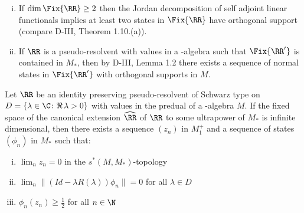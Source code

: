\begin{remark}\label{rem:d4-4.2}
\begin{enumerate}[(i), wide]
\item
If $ \dim \Fix{\RR} \geq 2 $  then the Jordan decomposition of self adjoint linear functionals implies at least two states in $ \Fix{\RR} $  have orthogonal support (compare D-III, Theorem 1.10.(a)).

\item
If $ \RR $  is a pseudo-resolvent with values in a \WA-algebra such that $ \Fix{\RR'} $  is contained in $ M_{*} $, then by D-III, Lemma 1.2 there exists a sequence of normal states in $ \Fix{\RR'} $  with orthogonal supports in $ M $.
\end{enumerate}
\end{remark}
\begin{lemma}\label{lem:d4-4.3}
Let $ \RR $  be an identity preserving pseudo-resolvent of Schwarz type on $ D = \{\lambda \in \C \colon  \Re\,\lambda > 0\} $  with values in the predual of a \WA-algebra $ M $.
If the fixed space of the canonical extension $ \widehat{\RR} $  of $ \RR $  to some ultrapower of $ M_{*} $  is infinite dimensional, then there exists a sequence $ (z_{n}) $  in $ M_{1}^{+} $  and a sequence of states $ (\phi_{n}) $  in $ M_{*} $  such that:
\begin{enumerate}[(i)]

\item\label{item:d4-4.3-i}
$ \lim_{n} z_{n} = 0 $  in the $ s^{*}(M,M_{*}) $-topology

\item\label{item:d4-4.3-ii}
$ \lim_{n} \|(Id - \lambda R(\lambda))\phi_{n}\| = 0 $  for all $ \lambda \in D $ 

\item\label{item:d4-4.3-iii}
$ \phi_{n}(z_{n}) \geq \frac{1}{2} $  for all $ n \in \N $ 
\end{enumerate}
\end{lemma}
